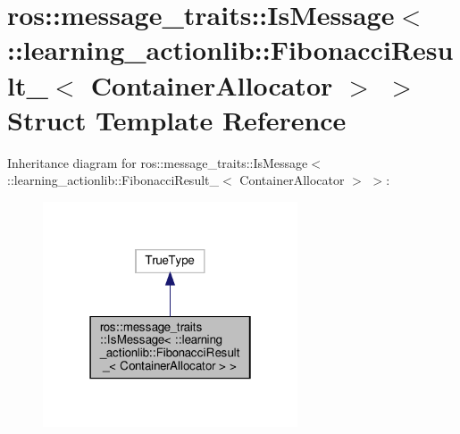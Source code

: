 \hypertarget{structros_1_1message__traits_1_1IsMessage_3_01_1_1learning__actionlib_1_1FibonacciResult___3_01ContainerAllocator_01_4_01_4}{}\section{ros\+:\+:message\+\_\+traits\+:\+:Is\+Message$<$ \+:\+:learning\+\_\+actionlib\+:\+:Fibonacci\+Result\+\_\+$<$ Container\+Allocator $>$ $>$ Struct Template Reference}
\label{structros_1_1message__traits_1_1IsMessage_3_01_1_1learning__actionlib_1_1FibonacciResult___3_01ContainerAllocator_01_4_01_4}


Inheritance diagram for ros\+:\+:message\+\_\+traits\+:\+:Is\+Message$<$ \+:\+:learning\+\_\+actionlib\+:\+:Fibonacci\+Result\+\_\+$<$ Container\+Allocator $>$ $>$\+:
\nopagebreak
\begin{figure}[H]
\begin{center}
\leavevmode
\includegraphics[width=214pt]{structros_1_1message__traits_1_1IsMessage_3_01_1_1learning__actionlib_1_1FibonacciResult___3_01C71d97c708f0230021dddf082be781d14}
\end{center}
\end{figure}


